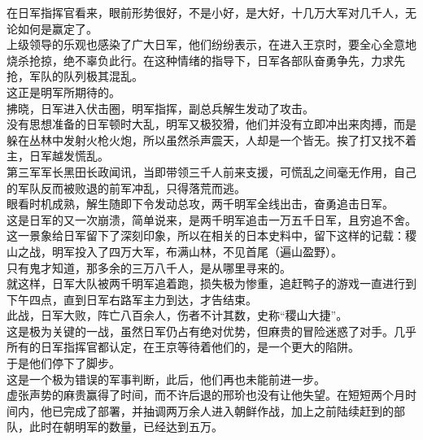 \begin{multicols}{\theparacolNo}
在日军指挥官看来，眼前形势很好，不是小好，是大好，十几万大军对几千人，无论如何是赢定了。\\

上级领导的乐观也感染了广大日军，他们纷纷表示，在进入王京时，要全心全意地烧杀抢掠，绝不辜负此行。在这种情绪的指导下，日军各部队奋勇争先，力求先抢，军队的队列极其混乱。\\

这正是明军所期待的。\\

拂晓，日军进入伏击圈，明军指挥，副总兵解生发动了攻击。\\

没有思想准备的日军顿时大乱，明军又极狡猾，他们并没有立即冲出来肉搏，而是躲在丛林中发射火枪火炮，所以虽然杀声震天，人却是一个皆无。挨了打又找不着主，日军越发慌乱。\\

第三军军长黑田长政闻讯，当即带领三千人前来支援，可慌乱之间毫无作用，自己的军队反而被败退的前军冲乱，只得落荒而逃。\\

眼看时机成熟，解生随即下令发动总攻，两千明军全线出击，奋勇追击日军。\\

这是日军的又一次崩溃，简单说来，是两千明军追击一万五千日军，且穷追不舍。这一景象给日军留下了深刻印象，所以在相关的日本史料中，留下这样的记载：稷山之战，明军投入了四万大军，布满山林，不见首尾（遍山盈野）。\\

只有鬼才知道，那多余的三万八千人，是从哪里寻来的。\\

就这样，日军大队被两千明军追着跑，损失极为惨重，追赶鸭子的游戏一直进行到下午四点，直到日军右路军主力到达，才告结束。\\

此战，日军大败，阵亡八百余人，伤者不计其数，史称“稷山大捷”。\\

这是极为关键的一战，虽然日军仍占有绝对优势，但麻贵的冒险迷惑了对手。几乎所有的日军指挥官都认定，在王京等待着他们的，是一个更大的陷阱。\\

于是他们停下了脚步。\\

这是一个极为错误的军事判断，此后，他们再也未能前进一步。\\

虚张声势的麻贵赢得了时间，而不许后退的邢玠也没有让他失望。在短短两个月时间内，他已完成了部署，并抽调两万余人进入朝鲜作战，加上之前陆续赶到的部队，此时在朝明军的数量，已经达到五万。\\


\end{multicols}

